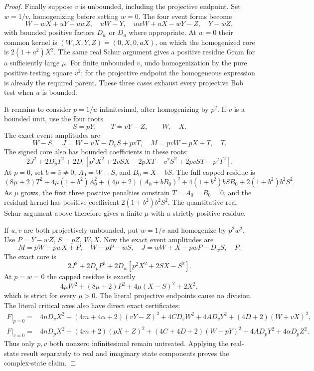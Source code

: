 \begin{proof}
Finally suppose $v$ is unbounded, including the projective
endpoint. Set $w=1/v$, homogenizing before setting $w=0$.
The four event forms become
\[
 W-wX+uY-uwZ,\quad uW-Y,\quad
 uwW+uX-wY-Z,\quad Y-wZ,
\]
with bounded positive factors $D_w$ or $D_u$ where appropriate.
At $w=0$ their common kernel is
$(W,X,Y,Z)=(0,X,0,aX)$, on which the homogenized core is
$2(1+a^2)X^2$. The same real Schur argument gives a positive
residue Gram for a sufficiently large $\mu$.
For finite unbounded $v$, undo homogenization by the pure
positive testing square $v^2$; for the projective endpoint the
homogeneous expression is already the required parent.
These three cases exhaust every projective Bob test when $u$ is bounded.

It remains to consider $p=1/u$ infinitesimal, after homogenizing
by $p^2$. If $v$ is a bounded unit, use the four roots
\[
 S=pY,\qquad T=vY-Z,\qquad W,\quad X.
\]
The exact event amplitudes are
\[
 W-S,\quad J=W+vX-D_vS+pvT,\quad
 M=pvW-pX+T,\quad T.
\]
The signed core also has bounded coefficients in these roots:
\[
 2J^2+2D_pT^2+2D_v
 [p^2X^2+2vSX-2pXT-v^2S^2+2pvST-p^2T^2].
\]
At $p=0$, set $b=\bar v\ne0$, $A_0=W-S$, and
$B_0=X-bS$. The full capped residue is
\[
 (8\mu+2)T^2+4\mu(1+b^2)A_0^2
 +(4\mu+2)(A_0+bB_0)^2
 +4(1+b^2)bSB_0+2(1+b^2)b^2S^2.
\]
As $\mu$ grows, the first three positive penalties constrain
$T=A_0=B_0=0$, and the residual kernel has positive coefficient
$2(1+b^2)b^2S^2$. The quantitative real Schur argument above
therefore gives a finite $\mu$ with a strictly positive residue.

If $u,v$ are both projectively unbounded, put $w=1/v$ and
homogenize by $p^2w^2$. Use $P=Y-wZ$, $S=pZ$, $W,X$.
Now the exact event amplitudes are
\[
 M=pW-pwX+P,\quad W-pP-wS,\quad
 J=wW+X-pwP-D_wS,\quad P.
\]
The exact core is
\[
 2J^2+2D_pP^2+2D_w[p^2X^2+2SX-S^2].
\]
At $p=w=0$ the capped residue is exactly
\[
 4\mu W^2+(8\mu+2)P^2+4\mu(X-S)^2+2X^2,
\]
which is strict for every $\mu>0$. The literal projective
endpoints cause no division. The literal critical axes also have direct exact certificates:
\begin{align*}
 F|_{p=0}={}&4nD_vX^2+(4m+4\alpha+2)(vY-Z)^2
 +4CD_vW^2+4AD_vY^2+(4D+2)(W+vX)^2,\\
 F|_{v=0}={}&4nD_pX^2+(4m+2)(pX+Z)^2
 +(4C+4D+2)(W-pY)^2+4AD_pY^2+4\alpha D_pZ^2.
\end{align*}
Thus only $p,v$ both nonzero infinitesimal remain untreated.
Applying the real-state result separately to real and imaginary
state components proves the complex-state claim.
\end{proof}

